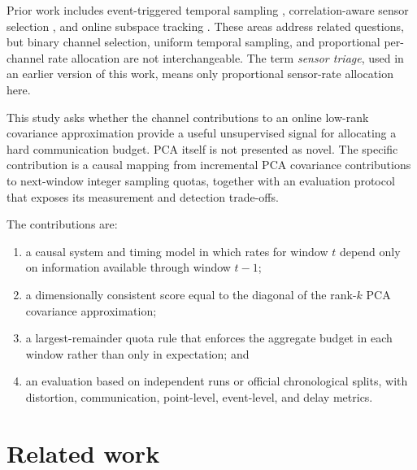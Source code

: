 \documentclass[12pt]{article}
\begin{document}
Prior work includes event-triggered temporal sampling
\cite{miskowicz2006send,gupta2018sbl}, correlation-aware sensor
selection \cite{bacciu2016unsupervised,ghosh2021adaptive}, and online subspace
tracking \cite{weng2003ccipca,balzano2010grouse,yang2018historypca}. These
areas address related questions, but binary channel selection, uniform temporal
sampling, and proportional per-channel rate allocation are not interchangeable.
The term \emph{sensor triage}, used in an earlier version of this work, means
only proportional sensor-rate allocation here.

This study asks whether the channel contributions to an online low-rank
covariance approximation provide a useful unsupervised signal for allocating a
hard communication budget. PCA itself is not presented as novel. The specific
contribution is a causal mapping from incremental PCA covariance contributions
to next-window integer sampling quotas, together with an evaluation protocol
that exposes its measurement and detection trade-offs.

The contributions are:
\begin{enumerate}[leftmargin=*]
\item a causal system and timing model in which rates for window $t$ depend only
on information available through window $t-1$;
\item a dimensionally consistent score equal to the diagonal of the rank-$k$
PCA covariance approximation;
\item a largest-remainder quota rule that enforces the aggregate budget in each
window rather than only in expectation; and
\item an evaluation based on independent runs or official chronological splits,
with distortion, communication, point-level, event-level, and delay metrics.
\end{enumerate}

\section{Related work}
\end{document}
